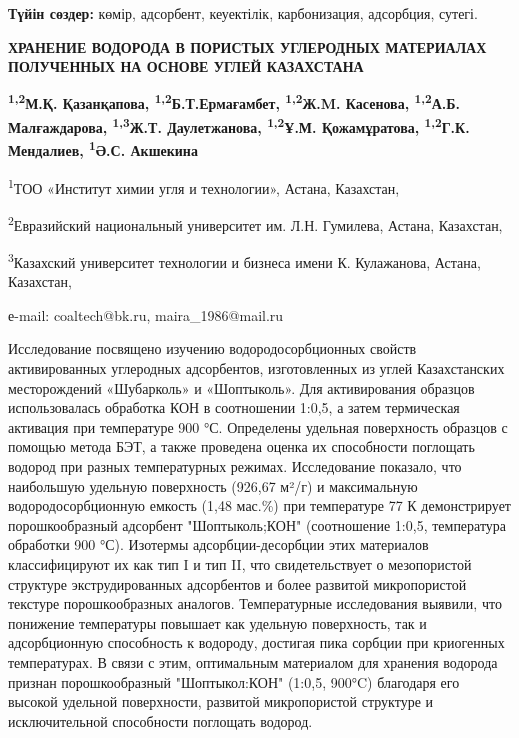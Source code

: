 {\bfseries Түйін сөздер:} көмір, адсорбент, кеуектілік, карбонизация,
адсорбция, сутегі.

\begin{articleheader}
{\bfseries ХРАНЕНИЕ ВОДОРОДА В ПОРИСТЫХ УГЛЕРОДНЫХ МАТЕРИАЛАХ ПОЛУЧЕННЫХ НА ОСНОВЕ УГЛЕЙ КАЗАХСТАНА}

{\bfseries
\textsuperscript{1,2}М.Қ. Қазанқапова\textsuperscript{\envelope },
\textsuperscript{1,2}Б.Т.Ермағамбет,
\textsuperscript{1,2}Ж.M. Касенова,
\textsuperscript{1,2}А.Б. Малғаждарова,
\textsuperscript{1,3}Ж.Т. Даулетжанова,
\textsuperscript{1,2}Ұ.М. Қожамұратова,
\textsuperscript{1,2}Г.К. Мендалиев,
\textsuperscript{1}Ә.С. Акшекина
}
\end{articleheader}

\begin{affiliation}
\textsuperscript{1}ТОО «Институт химии угля и технологии», Астана, Казахстан,

\textsuperscript{2}Евразийский национальный университет им. Л.Н. Гумилева, Астана, Казахстан,

\textsuperscript{3}Казахский университет технологии и бизнеса имени К. Кулажанова, Астана, Казахстан,

е-mail: coaltech@bk.ru, maira\_1986@mail.ru
\end{affiliation}

Исследование посвящено изучению водородосорбционных свойств
активированных углеродных адсорбентов, изготовленных из углей
Казахстанских месторождений «Шубарколь» и «Шоптыколь». Для активирования
образцов использовалась обработка КОН в соотношении 1:0,5, а затем
термическая активация при температуре 900 °С. Определены удельная
поверхность образцов с помощью метода БЭТ, а также проведена оценка их
способности поглощать водород при разных температурных режимах.
Исследование показало, что наибольшую удельную поверхность (926,67 м²/г)
и максимальную водородосорбционную емкость (1,48 мас.\%) при температуре
77 К демонстрирует порошкообразный адсорбент "Шоптыколь;КОН"
(соотношение 1:0,5, температура обработки 900 °С). Изотермы
адсорбции-десорбции этих материалов классифицируют их как тип I и тип
II, что свидетельствует о мезопористой структуре экструдированных
адсорбентов и более развитой микропористой текстуре порошкообразных
аналогов. Температурные исследования выявили, что понижение температуры
повышает как удельную поверхность, так и адсорбционную способность к
водороду, достигая пика сорбции при криогенных температурах. В связи с
этим, оптимальным материалом для хранения водорода признан
порошкообразный "Шоптыкол:КОН" (1:0,5, 900°C) благодаря его высокой
удельной поверхности, развитой микропористой структуре и исключительной
способности поглощать водород.

